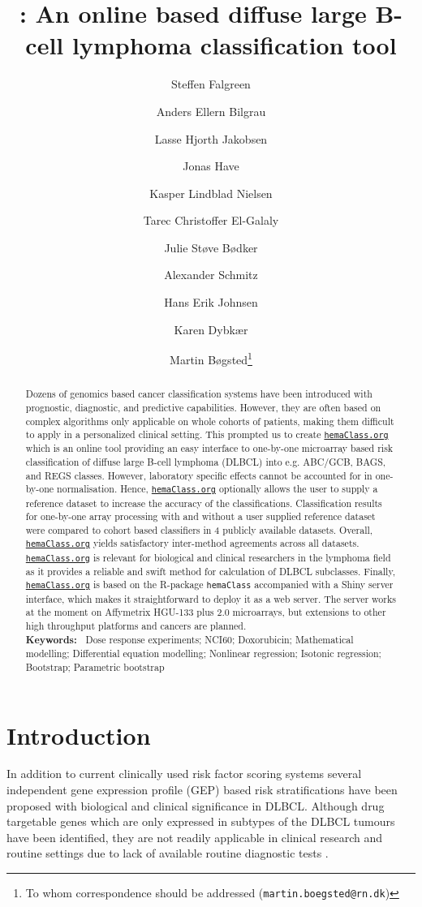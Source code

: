 \documentclass{article}
\title{\hemaClass{}: An online based diffuse large B-cell lymphoma classification tool}
\author[1]{Steffen Falgreen}
\author[12]{Anders Ellern Bilgrau}
\author[13]{Lasse Hjorth Jakobsen}
\author[13]{Jonas Have}
\author[13]{Kasper Lindblad Nielsen}
\author[1]{Tarec Christoffer El-Galaly}
\author[1]{Julie St{\o}ve  B{\o}dker}
\author[1]{Alexander Schmitz}
\author[13]{Hans Erik Johnsen}
\author[13]{Karen Dybk{\ae}r}
\author[13]{Martin B{\o}gsted\thanks{To whom correspondence should be addressed (\texttt{martin.boegsted@rn.dk})}}
\affil[1]{Department of Haematology, Aalborg University Hospital}
\affil[2]{Department of Mathematical Sciences, Aalborg University}
\affil[3]{Department of Clinical Medicine, Aalborg University}
\newcommand{\hemaClass}{\href{http://hemaClass.org}{\texttt{hemaClass.org}}}
\begin{document}
\maketitle
{}
{}
\begin{abstract}
Dozens of genomics based cancer classification systems have been introduced with prognostic, diagnostic, and predictive capabilities.
However, they are often based on complex algorithms only applicable on whole cohorts of patients, making them difficult to apply in a personalized clinical setting.
This prompted us to create \hemaClass{} which is an online tool providing an easy interface to one-by-one microarray based risk classification of diffuse large B-cell lymphoma (DLBCL) into e.g. ABC/GCB, BAGS, and REGS classes.
However, laboratory specific effects cannot be accounted for in one-by-one normalisation.
Hence, \hemaClass{} optionally allows the user to supply a reference dataset to increase the accuracy of the classifications.
Classification results for one-by-one array processing with and without a user supplied reference dataset were compared to cohort based classifiers in 4 publicly available datasets.
Overall, \hemaClass{} yields satisfactory inter-method agreements across all datasets.
 \hemaClass{} is relevant for biological and clinical researchers in the lymphoma field as it provides a reliable and swift method for calculation of DLBCL subclasses.
Finally, \hemaClass{} is based on the R-package \texttt{hemaClass} accompanied with a Shiny server interface, which makes it straightforward to deploy it as a web server. The server works at the moment on Affymetrix HGU-133 plus 2.0 microarrays, but extensions to other high throughput platforms and cancers are planned.
\medskip\\
\textbf{Keywords:~}
Dose response experiments; NCI60; Doxorubicin; Mathematical modelling; Differential equation modelling; Nonlinear regression; Isotonic regression; Bootstrap; Parametric bootstrap
\end{abstract}



\section{Introduction}

In addition to current clinically used risk factor scoring systems several independent gene expression profile (GEP) based risk stratifications have been proposed with biological and clinical significance in DLBCL.
Although drug targetable genes which are only expressed in subtypes of the DLBCL tumours have been identified, they are not readily applicable in clinical research and routine settings due to lack of available routine diagnostic tests \citep{Jaffe2009}.
\end{document}
